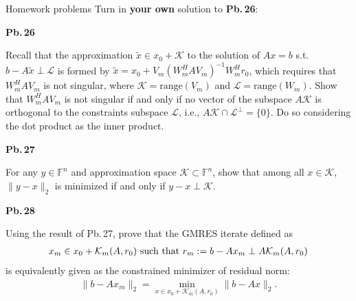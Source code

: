 \documentclass[t,usepdftitle=false]{beamer}
\begin{document}
\begin{frame}{Homework problems}\vspace{.1cm}
Turn in \textbf{your own} solution to \textbf{Pb.$\,$26}:\vspace{.15cm}\\
\begin{minipage}[t]{0.1\textwidth}
\textbf{Pb.$\,$26}
\end{minipage}
\begin{minipage}[t]{0.89\textwidth}
Recall that the approximation $\tilde{x}\in x_0+\mathcal{K}$ to the solution of $Ax=b$ s.t. $b-A\tilde{x}\perp\mathcal{L}$ is formed by $\tilde{x}=x_0+V_m(W_m^HAV_m)^{-1}W_m^Hr_0$, which requires that $W_m^HAV_m$ is not singular, where $\mathcal{K}=\text{range}(V_m)$ and $\mathcal{L}=\text{range}(W_m)$.
Show that $W_m^HAV_m$ is not singular if and only if no vector of the subspace $A\mathcal{K}$ is orthogonal to the constraints subspace $\mathcal{L}$, i.e., $A\mathcal{K}\cap \mathcal{L}^\perp=\{0\}$.
Do so considering the dot product as the inner product.
\end{minipage}\vspace{.15cm}
\begin{minipage}[t]{0.1\textwidth}
\textbf{Pb.$\,$27}
\end{minipage}
\begin{minipage}[t]{0.89\textwidth}
For any $y\in\mathbb{F}^n$ and approximation space $\mathcal{K}\subset\mathbb{F}^n$, show that among all $x\in\mathcal{K}$, $\|y-x\|_2$ is minimized if and only if $y-x\perp \mathcal{K}$.
\end{minipage}\vspace{.15cm}
\begin{minipage}[t]{0.1\textwidth}
\textbf{Pb.$\,$28}
\end{minipage}
\begin{minipage}[t]{0.89\textwidth}
Using the result of Pb.$\,$27, prove that the GMRES iterate defined as\vspace{-.2cm}
\begin{align*}
x_m\in x_0+\mathcal{K}_m(A,r_0)
\text{ such that }
r_m:=b-Ax_m\perp A\mathcal{K}_m(A,r_0)\vspace{-.2cm}
\end{align*}
is equivalently given as the constrained minimizer of residual norm:\vspace{-.2cm}
\begin{align*}
\|b-Ax_m\|_2=\min_{x\in x_0+\mathcal{K}_m(A,r_0)}\|b-Ax\|_2.
\end{align*}
\end{minipage}
\end{frame}
\end{document}
